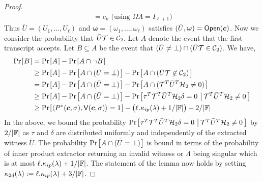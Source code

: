 \begin{proof}
\begin{align*}
	&= c_k \text{ (using $\Omega\Lambda=I_{\ell+1})$ }
\end{align*}
Thus $\bar{U}=(U_1,\ldots,U_{\ell})$ and $\bm{\omega}=(\omega_1,\ldots,\omega_{\ell})$ satisfies $(\bar{U},\bm{\omega})=\mathsf{Open}(\bm{c})$. Now we
consider the probability that $\bar{U}\mathcal{T}\in \mathcal{C}_2$. Let $A$ denote the event
that the first transcript accepts. Let $B\subseteq A$ be the event that
$(\bar{U}\neq\bot)\cap (\bar{U}\mathcal{T}\in \mathcal{C}_2)$. We have,
\begin{align*}
\prob{B} &= \prob{A} - \prob{A\cap \neg B} \\
	&\geq \prob{A} - \prob{A\cap (\bar{U}=\bot)} - \prob{A\cap
(\bar{U}\mc{T}\not\in \mc{C}_2)} \\
	&= \prob{A} - \prob{A\cap (\bar{U}=\bot)} - \prob{A\cap
(\mc{T}^T\bar{U}^T\mc{H}_2\neq 0)} \\
	&\geq \prob{A} - \prob{A\cap (\bar{U}=\bot)} -
\condprob{\tau^T\mc{T}^T\bar{U}^T\mc{H}_2\delta=
0}{\mc{T}^T\bar{U}^T\mc{H}_2\neq 0} \\
	&\geq \prob{\langle P^\ast(\bm{c},\sigma),\verifier(\bm{c},\sigma)\rangle=1}
- \big(\ell.\kappa_{ip}(\secpar)+1/|\FF|\big) - 2/|\FF|
\end{align*} 
In the above, we bound the probability $\condprob{\tau^T\mc{T}^T\bar{U}^T\mc{H}_2\delta=
0}{\mc{T}^T\bar{U}^T\mc{H}_2\neq 0}$ by $2/|\mathbb{F}|$ as $\tau$ and $\delta$ are
distributed uniformly and independently of the extracted witness $\bar{U}$. The
probability $\prob{A\cap (\bar{U}=\bot)}$ is bound in terms of the probability
of inner product extractor returning an invalid witness or $\Lambda$ being
singular which is at most $\ell.\kappa_{ip}(\lambda)+1/|\mathbb{F}|$. The
statement of the lemma now holds by setting
$\kappa_{2d}(\lambda):=\ell.\kappa_{ip}(\lambda) + 3/|\mathbb{F}|$.
\end{proof}

